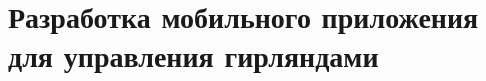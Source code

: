 \section{Разработка мобильного приложения для управления гирляндами}
\label{sec:develop}











